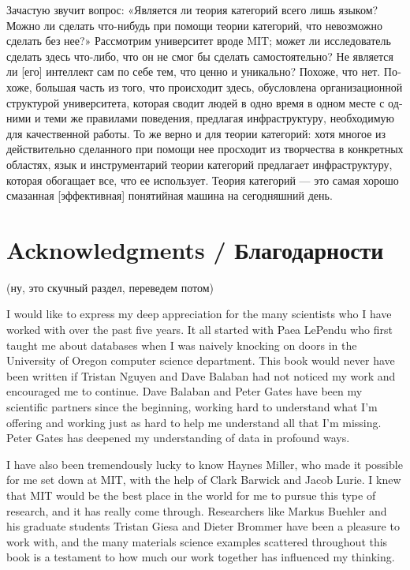 \documentclass[a4paper]{book}
\theoremstyle{myth}
\begin{document}
\begin{russian}
Зачастую звучит вопрос: «Является ли теория категорий всего лишь языком? Можно ли сделать что-нибудь при помощи теории категорий, что невозможно сделать без нее?» Рассмотрим университет вроде MIT; может ли исследователь сделать здесь что-либо, что он не смог бы сделать самостоятельно? Не является ли [его] интеллект сам по себе тем, что ценно и уникально? Похоже, что нет. Похоже, большая часть из того, что происходит здесь, обусловлена организационной структурой университета, которая сводит людей в одно время в одном месте с одними и теми же правилами поведения, предлагая инфраструктуру, необходимую для качественной работы. То же верно и для теории категорий: хотя многое из действительно сделанного при помощи нее просходит из творчества в конкретных областях, язык и инструментарий теории категорий предлагает инфраструктуру, которая обогащает все, что ее использует. Теория категорий — это самая хорошо смазанная [эффективная] понятийная машина на сегодняшний день. 


\section{Acknowledgments / Благодарности}

(ну, это скучный раздел, переведем потом) 

I would like to express my deep appreciation for the many scientists who I have worked with over the past five years. It all started with Paea LePendu who first taught me about databases when I was naively knocking on doors in the University of Oregon computer science department. This book would never have been written if Tristan Nguyen and Dave Balaban had not noticed my work and encouraged me to continue. Dave Balaban and Peter Gates have been my scientific partners since the beginning, working hard to understand what I'm offering and working just as hard to help me understand all that I'm missing. Peter Gates has deepened my understanding of data in profound ways.

 

I have also been tremendously lucky to know Haynes Miller, who made it possible for me set down at MIT, with the help of Clark Barwick and Jacob Lurie. I knew that MIT would be the best place in the world for me to pursue this type of research, and it has really come through. Researchers like Markus Buehler and his graduate students Tristan Giesa and Dieter Brommer have been a pleasure to work with, and the many materials science examples scattered throughout this book is a testament to how much our work together has influenced my thinking.


\end{russian}
\end{document}
